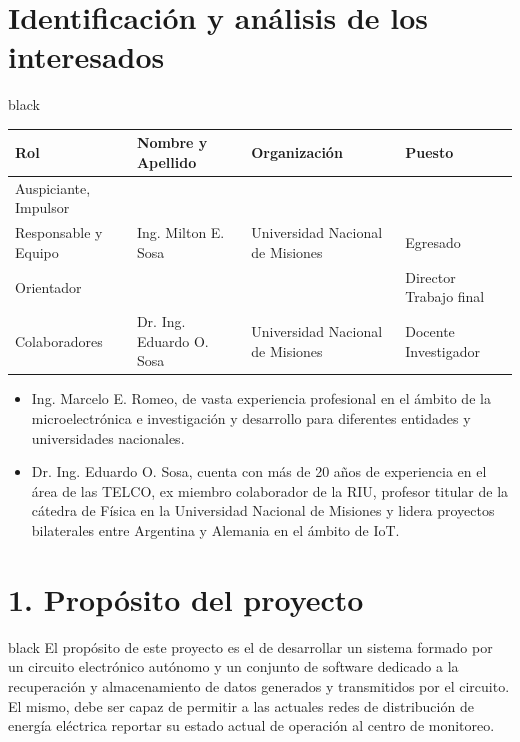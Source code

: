 \documentclass[11pt]{charter}
\begin{document}
\section{Identificación y análisis de los interesados}
\label{sec:interesados}

\begin{consigna}{black} 

\begin{table}[H]
\begin{tabularx}{\linewidth}{@{}|l|X|X|l|@{}}
\hline
\rowcolor[HTML]{C0C0C0} 
Rol           & Nombre y Apellido & Organización 	& Puesto 	\\ \hline
Auspiciante, Impulsor\\Responsable y Equipo  	    & Ing. Milton E. Sosa & Universidad Nacional de Misiones &Egresado   	\\ \hline
Orientador    & \supname	      & \pertesupname 	& Director	Trabajo final \\ \hline
Colaboradores & Dr. Ing. Eduardo O. Sosa                  &Universidad Nacional de Misiones             	&Docente Investigador    	\\ \hline

\end{tabularx}
\end{table}
 
\begin{itemize}
\item Ing. Marcelo E. Romeo, de vasta experiencia profesional en el ámbito de la microelectrónica e investigación y desarrollo para diferentes entidades y universidades nacionales.
\item Dr. Ing. Eduardo O. Sosa, cuenta con más de 20 años de experiencia en el área de las TELCO, ex miembro colaborador de la RIU, profesor titular de la cátedra de Física en la Universidad Nacional de Misiones y lidera proyectos bilaterales entre Argentina y Alemania en el ámbito de IoT.
\end{itemize}

\end{consigna}


\section{1. Propósito del proyecto}
\label{sec:proposito}

\begin{consigna}{black}
El propósito de este proyecto es el de desarrollar un sistema formado por un circuito electrónico autónomo y un conjunto de software dedicado a la recuperación y almacenamiento de datos generados y transmitidos por el circuito.\\
El mismo, debe ser capaz de permitir a las actuales redes de distribución de energía eléctrica reportar su estado actual de operación al centro de monitoreo.
\end{consigna}
\end{document}
